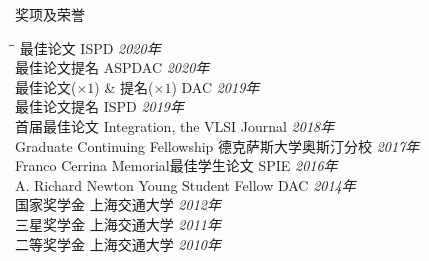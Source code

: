 
\begin{rSection}{奖项及荣誉}
\begin{tabbing}
\hspace{3.3in}\= \hspace{3.1in}\= \kill
最佳论文 \> ISPD \> {\em 2020年 } \\
最佳论文提名 \> ASPDAC \> {\em 2020年 } \\
最佳论文($\times 1$) \& 提名($\times 1$) \> DAC \> {\em 2019年 } \\
最佳论文提名 \> ISPD \> {\em 2019年 } \\
首届最佳论文 \> Integration, the VLSI Journal \> {\em 2018年 } \\
Graduate Continuing Fellowship \> 德克萨斯大学奥斯汀分校 \> {\em 2017年 } \\
Franco Cerrina Memorial最佳学生论文 \> SPIE \> {\em 2016年 } \\
A. Richard Newton Young Student Fellow \> DAC \> {\em 2014年 } \\
国家奖学金 \> 上海交通大学 \> {\em 2012年 } \\
三星奖学金 \> 上海交通大学 \> {\em 2011年 } \\
二等奖学金 \> 上海交通大学 \> {\em 2010年 }
\end{tabbing}
\end{rSection}

